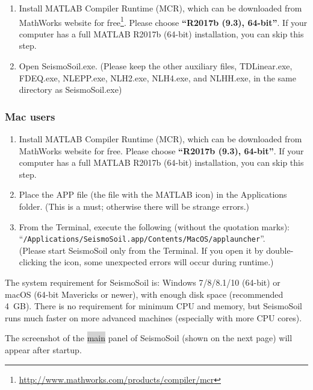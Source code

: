 \documentclass[11pt,letterpaper]{article}
\newcommand{\panel}[1]{\colorbox{lightgray}{\textsf{#1}}}
\begin{document}
\begin{enumerate}
	\item Install MATLAB Compiler Runtime (MCR), which can be downloaded from MathWorks website for free\footnote{\href{http://www.mathworks.com/products/compiler/mcr}{\textsf{http://www.mathworks.com/products/compiler/mcr}}}. Please choose \textbf{``R2017b (9.3), 64-bit''}. If your computer has a full MATLAB R2017b (64-bit) installation, you can skip this step.
	
	\item Open {\textsf{{SeismoSoil.exe}}}. (Please keep the other auxiliary files, {\textsf{TDLinear.exe}}, {\textsf{FDEQ.exe}}, {\textsf{NLEPP.exe}}, {\textsf{NLH2.exe}}, {\textsf{NLH4.exe}}, and {\textsf{NLHH.exe}}, in the same directory as {\textsf{{SeismoSoil.exe}}})
\end{enumerate}

\subsubsection{Mac users}

\begin{enumerate}
	\item Install MATLAB Compiler Runtime (MCR), which can be downloaded from MathWorks website for free. Please choose \textbf{``R2017b (9.3), 64-bit''}. If your computer has a full MATLAB R2017b (64-bit) installation, you can skip this step.
    
	\item Place the APP file (the file with the MATLAB icon) in the Applications folder. (This is a must; otherwise there will be strange errors.)
	\item From the Terminal, execute the following (without the quotation marks):\\
	 ``\texttt{/Applications/SeismoSoil.app/Contents/MacOS/applauncher}''. \\(Please start SeismoSoil only from the Terminal. If you open it by double-clicking the icon, some unexpected errors will occur during runtime.)
\end{enumerate}

The system requirement for SeismoSoil is: Windows 7/8/8.1/10 (64-bit) or macOS (64-bit Mavericks or newer), with enough disk space (recommended 4~GB). There is no requirement for minimum CPU and memory, but SeismoSoil runs much faster on more advanced machines (especially with more CPU cores).

The screenshot of the \panel{main} panel of SeismoSoil (shown on the next page) will appear after startup.
\end{document}
